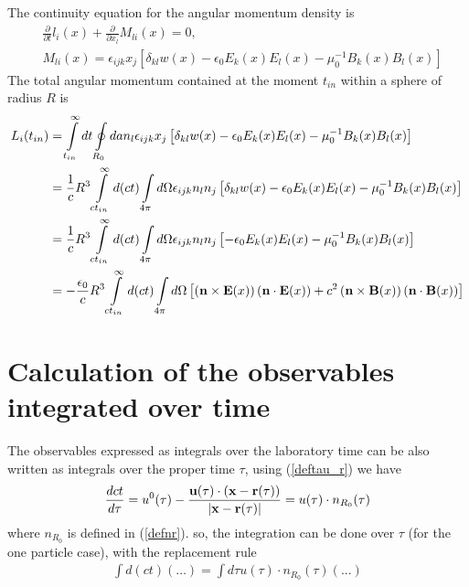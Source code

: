 The continuity equation for the angular momentum density is
\begin{align}
     & \frac{\partial}{\partial t} l_i(x)+\frac{\partial}{\partial x_l} M_{l i}(x)=0,\nonumber                         \\
     & M_{l i}(x)=\epsilon_{i j k} x_j\left[ \delta_{k l}w(x)-\epsilon_0 E_k(x) E_l(x)-\mu_0^{-1} B_k(x) B_l(x)\right]
\end{align}
The total angular momentum contained at the moment $t_{in}$ within a sphere of radius $R$ is
\begin{align}
    L_i(t_{in}) & =\int\limits_{t_{in}}^{\infty}dt\oint\limits_{R_0} da n_l\epsilon_{i j k} x_j\left[ \delta_{k l}w(x)-\epsilon_0 E_k(x) E_l(x)-\mu_0^{-1} B_k(x) B_l(x)\right]\nonumber                                                                              \\
                & =\frac1c R^3\int\limits_{ct_{in}}^{\infty}d(ct)\int\limits_{4\pi} d\Omega \epsilon_{i j k} n_ln_j\left[ \delta_{k l}w(x)-\epsilon_0 E_k(x) E_l(x)-\mu_0^{-1} B_k(x) B_l(x)\right]\nonumber                                                          \\
                & =\frac1c R^3\int\limits_{ct_{in}}^{\infty}d(ct)\int\limits_{4\pi} d\Omega \epsilon_{i j k} n_ln_j\left[ -\epsilon_0 E_k(x) E_l(x)-\mu_0^{-1} B_k(x) B_l(x)\right]\nonumber                                                                          \\
                & =-\frac{\epsilon_0}c R^3\int\limits_{ct_{in}}^{\infty}d(ct)\int\limits_{4\pi}d\Omega\left[\left({\bf n}\times{\bf E}(x)\right)\left({\bf n}\cdot{\bf E}(x)\right)+c^2\left({\bf n}\times{\bf B}(x)\right)\left({\bf n}\cdot{\bf B}(x)\right)\right]
\end{align}


\section{Calculation of the observables integrated over time}

The observables expressed as integrals over the laboratory time can be also written as integrals over the proper time $\tau$, using (\ref{deftau_r}) we have
\begin{align}
    \frac{d{ct}}{d\tau} = u^0(\tau)-\frac{{\bf u}(\tau)\cdot({\bf x-{\bf r(\tau)}})}{|{\bf x-{\bf r(\tau)}}|}=u(\tau)\cdot n_{R_0}(\tau)
\end{align}
where $n_{R_0}$ is defined in (\ref{defnr}).
so, the integration can  be done over $\tau$ (for the one particle case), with the replacement rule
\begin{align}
    \int d(ct) (\ldots) = \int d\tau u(\tau) \cdot n_{R_0}(\tau) (...)
\end{align}

